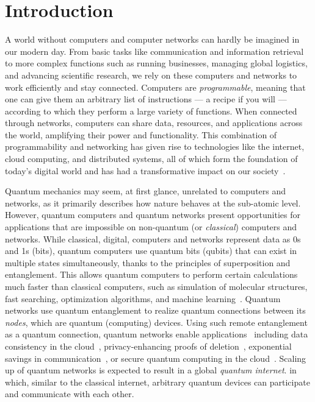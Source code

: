 \chapter{Introduction}
\label{chp:intro}

A world without computers and computer networks can hardly be imagined in our modern day.
From basic tasks like communication and information retrieval to more complex functions such as running businesses, managing global logistics, and advancing scientific research, we rely on these computers and networks to work efficiently and stay connected.
Computers are \emph{programmable}, meaning that one can give them an arbitrary list of instructions --- a recipe if you will --- according to which they perform a large variety of functions.
When connected through networks, computers can share data, resources, and applications across the world, amplifying their power and functionality.
This combination of programmability and networking has given rise to technologies like the internet, cloud computing, and distributed systems, all of which form the foundation of today's digital world and has had a transformative impact on our society~\cite{castells_impact_2013}.

Quantum mechanics may seem, at first glance, unrelated to computers and networks, as it primarily describes how nature behaves at the sub-atomic level.
However, quantum computers and quantum networks present opportunities for applications that are impossible on non-quantum (or \emph{classical}) computers and networks.
While classical, digital, computers and networks represent data as 0s and 1s (bits), quantum computers use quantum bits (qubits) that can exist in multiple states simultaneously, thanks to the principles of superposition and entanglement.
This allows quantum computers to perform certain calculations much faster than classical computers, such as simulation of molecular structures, fast searching, optimization algorithms, and machine learning~\cite{montanaro_quantum_2016, dalzell_quantum_2023}.
Quantum networks use quantum entanglement to realize quantum connections between its \emph{nodes}, which are quantum (computing) devices.
Using such remote entanglement as a quantum connection, quantum networks enable applications~\cite{wehner_2018_stages} including data consistency in the cloud~\cite{benor_2005_byzantine}, privacy-enhancing proofs of deletion~\cite{poremba_quantum_2022}, exponential savings in communication~\cite{guerin_exponential_2016}, or secure quantum computing in the cloud~\cite{broadbent_2009_ubqc,childs_2005_secure_qc}.
Scaling up of quantum networks is expected to result in a global \textit{quantum internet}.
in which, similar to the classical internet, arbitrary quantum devices can participate and communicate with each other.


